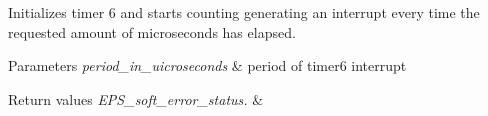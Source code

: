 Initializes timer 6 and starts counting generating an interrupt every time the requested amount of microseconds has elapsed. 


\begin{DoxyParams}{Parameters}
{\em period\-\_\-in\-\_\-uicroseconds} & period of timer6 interrupt \\
\hline
\end{DoxyParams}

\begin{DoxyRetVals}{Return values}
{\em E\-P\-S\-\_\-soft\-\_\-error\-\_\-status.} & \\
\hline
\end{DoxyRetVals}
